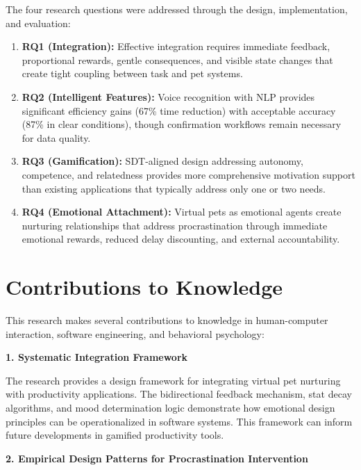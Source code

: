The four research questions were addressed through the design, implementation, and evaluation:

\begin{enumerate}
    \item \textbf{RQ1 (Integration):} Effective integration requires immediate feedback, proportional rewards, gentle consequences, and visible state changes that create tight coupling between task and pet systems.
    
    \item \textbf{RQ2 (Intelligent Features):} Voice recognition with NLP provides significant efficiency gains (67\% time reduction) with acceptable accuracy (87\% in clear conditions), though confirmation workflows remain necessary for data quality.
    
    \item \textbf{RQ3 (Gamification):} SDT-aligned design addressing autonomy, competence, and relatedness provides more comprehensive motivation support than existing applications that typically address only one or two needs.
    
    \item \textbf{RQ4 (Emotional Attachment):} Virtual pets as emotional agents create nurturing relationships that address procrastination through immediate emotional rewards, reduced delay discounting, and external accountability.
\end{enumerate}

\section{Contributions to Knowledge}
\label{sec:contributions}

\completed

This research makes several contributions to knowledge in human-computer interaction, software engineering, and behavioral psychology:

\textbf{1. Systematic Integration Framework}

The research provides a design framework for integrating virtual pet nurturing with productivity applications. The bidirectional feedback mechanism, stat decay algorithms, and mood determination logic demonstrate how emotional design principles can be operationalized in software systems. This framework can inform future developments in gamified productivity tools.

\textbf{2. Empirical Design Patterns for Procrastination Intervention}

